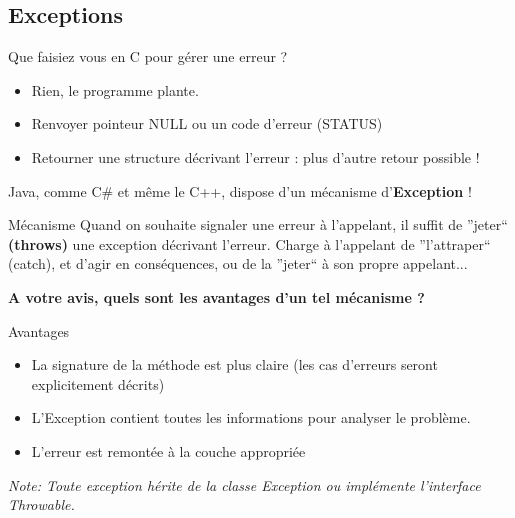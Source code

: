 \documentclass[handout]{beamer}
\begin{document}
\subsection{Exceptions}
\begin{frame}
	\begin{block}{Que faisiez vous en C pour gérer une erreur ?}
		\begin{itemize}
			\item Rien, le programme plante.
			\item Renvoyer pointeur NULL ou un code d'erreur (STATUS)
			\item Retourner une structure décrivant l'erreur : plus d'autre retour possible !
		\end{itemize}
	Java, comme C{\#} et même le C++, dispose d'un mécanisme d'\textbf{Exception} !
	\end{block}	
	\begin{block}{Mécanisme}
		Quand on souhaite signaler une erreur à l'appelant, il suffit de ''jeter`` \textbf{(throws)} une exception décrivant l'erreur. Charge à l'appelant de ''l'attraper`` (catch), et d'agir en conséquences, ou de la ''jeter`` à son propre appelant...
	\end{block}
	\begin{center}
		\textbf{A votre avis, quels sont les avantages d'un tel mécanisme ?}
	\end{center}
\end{frame}

\begin{frame}
	\begin{block}{Avantages}
		\begin{itemize}
			\item La signature de la méthode est plus claire (les cas d'erreurs
				seront explicitement décrits)
			\item L'Exception contient toutes les informations pour analyser le problème.
			\item L'erreur est remontée à la couche appropriée
		\end{itemize}
		\textit{Note: Toute exception hérite de la classe Exception ou implémente l'interface Throwable.}
	\end{block}
\end{frame}

\begin{frame}
	
\end{frame}
\end{document}
